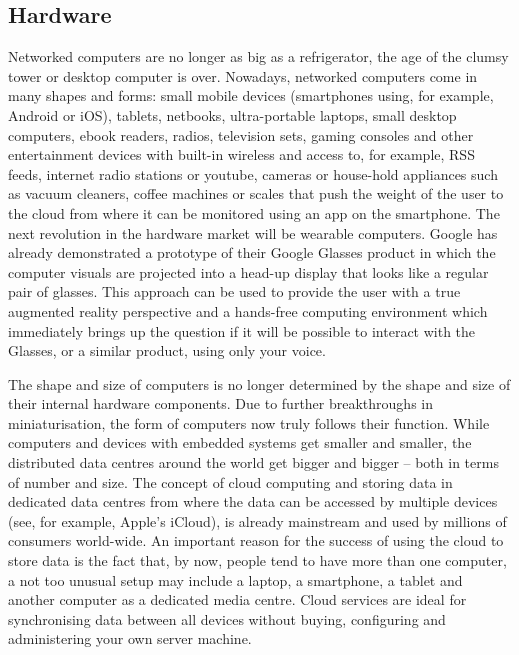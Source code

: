 \documentclass[10pt, plain]{../../metanetpaper}
\begin{document}
\begin{multicols}{2}

\subsection{Hardware}
\label{sec:hardware}

Networked computers are no longer as big as a refrigerator, the age of the clumsy tower or desktop computer is over. Nowadays, networked computers come in many shapes and forms: small mobile devices (smartphones using, for example, Android or iOS), tablets, netbooks, ultra-portable laptops, small desktop computers, ebook readers, radios, television sets, gaming consoles and other entertainment devices with built-in wireless and access to, for example, RSS feeds, internet radio stations or youtube, cameras or house-hold appliances such as vacuum cleaners, coffee machines or scales that push the weight of the user to the cloud from where it can be monitored using an app on the smartphone. The next revolution in the hardware market will be wearable computers. Google has already demonstrated a prototype of their Google Glasses product in which the computer visuals are projected into a head-up display that looks like a regular pair of glasses. This approach can be used to provide the user with a true augmented reality perspective and a hands-free computing environment which immediately brings up the question if it will be possible to interact with the Glasses, or a similar product, using only your voice.

The shape and size of computers is no longer determined by the shape and size of their internal hardware components. Due to further breakthroughs in miniaturisation, the form of computers now truly follows their function. While computers and devices with embedded systems get smaller and smaller, the distributed data centres around the world get bigger and bigger -- both in terms of number and size. The concept of cloud computing and storing data in dedicated data centres from where the data can be accessed by multiple devices (see, for example, Apple's iCloud), is already mainstream and used by millions of consumers world-wide. An important reason for the success of using the cloud to store data is the fact that, by now, people tend to have more than one computer, a not too unusual setup may include a laptop, a smartphone, a tablet and another computer as a dedicated media centre. Cloud services are ideal for synchronising data between all devices without buying, configuring and administering your own server machine.


\end{multicols}
\end{document}
